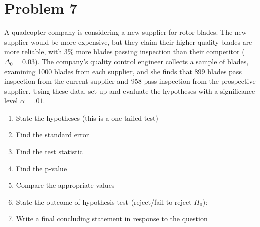 \documentclass[11pt,twoside]{article}
\newcommand{\pts}[1]{\marginpar{ \small\hspace{0pt} \textit{[#1]} } }
\newcommand{\?}{\stackrel{?}{=}}
\begin{document}
\section*{Problem 7 }
A quadcopter company is considering a new supplier for rotor blades. The new supplier would be more expensive, but they claim their higher-quality blades are more reliable,  with 3\% more blades passing inspection than their competitor ($\Delta_0 = 0.03$).
The company's quality control engineer collects a sample of blades, examining 1000 blades from each supplier, and she finds that 899 blades pass inspection from the current supplier and 958 pass inspection from the prospective supplier.
Using these data, set up and evaluate the hypotheses with a significance level $\alpha = .01$.
 \begin{enumerate}[\bf (a)]
  \item State the hypotheses (this is a one-tailed test)\pts{2}
      \vspace{6ex}

  \item Find the standard error \pts{2}
      \vspace{15ex}

  \item Find the test statistic \pts{2}
  \vspace{30ex}

  \item Find the p-value \pts{2}
      \vspace{15ex}

  \item Compare the appropriate values \pts{1}
       \vspace{4ex}

  \item State the outcome of hypothesis test (reject/fail to reject $H_0$): \pts{1}
  \item Write a final concluding statement in response to the question \pts{2}
 \end{enumerate}
\end{document}
